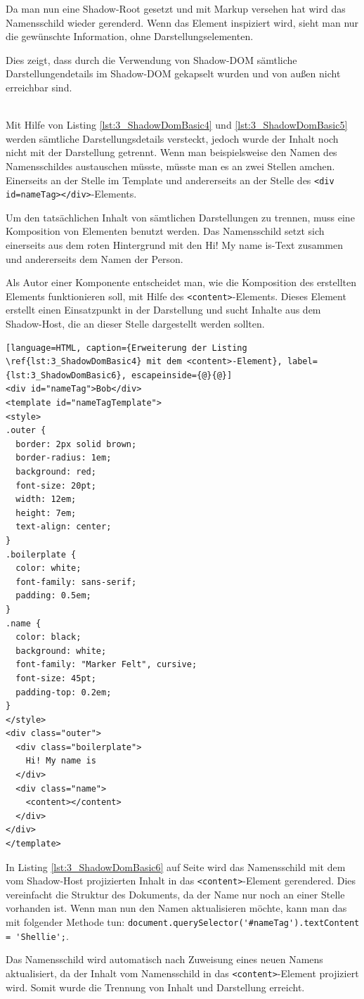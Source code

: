 \begin{enumerate}
Da man nun eine Shadow-Root gesetzt und mit Markup versehen hat wird das Namensschild wieder gerenderd. Wenn das Element inspiziert wird, sieht man nur die gewünschte Information, ohne Darstellungselementen.

Dies zeigt, dass durch die Verwendung von Shadow-DOM sämtliche Darstellungendetails im Shadow-DOM gekapselt wurden und von außen nicht erreichbar sind.

 \hfill \\
Mit Hilfe von Listing \ref{lst:3_ShadowDomBasic4} und \ref{lst:3_ShadowDomBasic5} werden sämtliche Darstellungsdetails versteckt, jedoch wurde der Inhalt noch nicht mit der Darstellung getrennt. Wenn man beispielsweise den Namen des Namensschildes austauschen müsste, müsste man es an zwei Stellen amchen. Einerseits an der Stelle im Template und andererseits an der Stelle des \lstinline|<div id=nameTag></div>|-Elements.

Um den tatsächlichen Inhalt von sämtlichen Darstellungen zu trennen, muss eine Komposition von Elementen benutzt werden. Das Namensschild setzt sich einerseits aus dem roten Hintergrund mit den \glqq Hi! My name is\grqq -Text zusammen und andererseits dem Namen der Person.

Als Autor einer Komponente entscheidet man, wie die Komposition des erstellten Elements funktionieren soll, mit Hilfe des \lstinline|<content>|-Elements. Dieses Element erstellt einen Einsatzpunkt in der Darstellung und sucht Inhalte aus dem Shadow-Host, die an dieser Stelle dargestellt werden sollten.

\begin{lstlisting}[language=HTML, caption={Erweiterung der Listing \ref{lst:3_ShadowDomBasic4} mit dem <content>-Element}, label={lst:3_ShadowDomBasic6}, escapeinside={@}{@}]
<div id="nameTag">Bob</div>
<template id="nameTagTemplate">
<style>
.outer {
  border: 2px solid brown;
  border-radius: 1em;
  background: red;
  font-size: 20pt;
  width: 12em;
  height: 7em;
  text-align: center;
}
.boilerplate {
  color: white;
  font-family: sans-serif;
  padding: 0.5em;
}
.name {
  color: black;
  background: white;
  font-family: "Marker Felt", cursive;
  font-size: 45pt;
  padding-top: 0.2em;
}
</style>
<div class="outer">
  <div class="boilerplate">
    Hi! My name is
  </div>
  <div class="name">
    <content></content>
  </div>
</div>
</template>
\end{lstlisting}

In Listing \ref{lst:3_ShadowDomBasic6} auf Seite \pageref{lst:3_ShadowDomBasic6} wird das Namensschild mit dem vom Shadow-Host projizierten Inhalt in das \lstinline|<content>|-Element gerendered.
Dies vereinfacht die Struktur des Dokuments, da der Name nur noch an einer Stelle vorhanden ist. Wenn man nun den Namen aktualisieren möchte, kann man das mit folgender Methode tun: \lstinline|document.querySelector('#nameTag').textContent = 'Shellie';|.

Das Namensschild wird automatisch nach Zuweisung eines neuen Namens aktualisiert, da der Inhalt vom Namensschild in das \lstinline|<content>|-Element projiziert wird. Somit wurde die Trennung von Inhalt und Darstellung erreicht.
\end{enumerate}